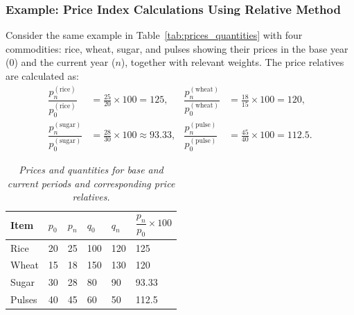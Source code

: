 \documentclass[twoside]{book}
\begin{document}
\subsubsection{Example: Price Index Calculations Using Relative Method}
Consider the same example in Table~\ref{tab:prices_quantities} with four commodities: rice, wheat, sugar, and pulses showing their prices in the base year (0) and the current year ($ n $), together with relevant weights. The price relatives are calculated as:
\begin{align*}
\dfrac{p_n^{(\text{rice})}}{p_0^{(\text{rice})}}   &= \frac{25}{20}\times100 = 125, &
\dfrac{p_n^{(\text{wheat})}}{p_0^{(\text{wheat})}}   &= \frac{18}{15}\times100 = 120,\\
\dfrac{p_n^{(\text{sugar})}}{p_0^{(\text{sugar})}}   &= \frac{28}{30}\times100 \approx 93.33, &
\dfrac{p_n^{(\text{pulse})}}{p_0^{(\text{pulse})}}  &= \frac{45}{40}\times100 = 112.5.
\end{align*}

\begin{table}[H]
\centering
\begin{tabular}{p{2cm}|C{1.5cm}C{1.5cm}|C{1.5cm}C{1.5cm}|C{2cm}}
\toprule
\textbf{Item} & $p_0$ & $p_n$ & $q_0$ & $q_n$ &  $\dfrac{p_n}{p_0}\times 100$\\
\midrule
Rice    & 20  & 25  & 100 & 120 & 125\\
Wheat   & 15  & 18  & 150 & 130 & 120\\
Sugar   & 30  & 28  &  80 &  90 & 93.33\\
Pulses  & 40  & 45  &  60 &  50 & 112.5\\
\bottomrule
\end{tabular}
\caption{\textit{Prices and quantities for base and current periods and corresponding price relatives.}}
\label{tab:prices_quantities2}
\end{table}
\end{document}
